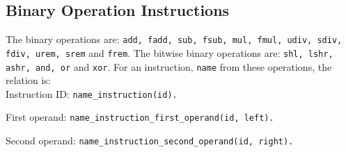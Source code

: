 \subsection{Binary Operation Instructions} 
The binary operations are: \texttt{add, fadd, sub, fsub, mul, fmul, udiv, sdiv, fdiv, urem, srem} and \texttt{frem}.
The bitwise binary operations are: \texttt{shl, lshr, ashr, and, or} and \texttt{xor}.
For an instruction, \texttt{name} from these operations, the relation is:\\

\noindent Instruction ID:
\texttt{name\_instruction(id).}

\noindent First operand:
\texttt{name\_instruction\_first\_operand(id, left).}

\noindent Second operand:
\texttt{name\_instruction\_second\_operand(id, right).}

